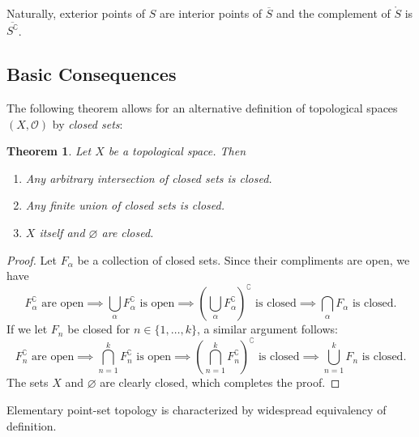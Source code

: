 \documentclass[11pt]{article}
\newtheorem{theorem}{Theorem}
\renewcommand{\O}{\mathcal{O}}
\begin{document}
Naturally, exterior points of $S$ are interior points of $\overline{S}$ and the complement of $\mathring{S}$ is $\overline{S^{\complement}}$.


\subsection{Basic Consequences}

The following theorem allows for an alternative definition of topological spaces $(X, \O)$ by \textit{closed sets}:

\begin{adjustwidth}{0.5cm}{}
  \begin{theorem}
    Let $X$ be a topological space. Then
    \begin{enumerate}
      \item Any arbitrary intersection of closed sets is closed.
      \item Any finite union of closed sets is closed.
      \item $X$ itself and $\varnothing$ are closed.
    \end{enumerate}
\end{theorem}
  \begin{proof}
    Let $F_{\alpha}$ be a collection of closed sets. Since their compliments are open, we have
    \[
      F_{\alpha}^{\complement} \text{ are open} \implies \bigcup\limits_{\alpha} F_{\alpha}^{\complement} \text{ is open} \implies \left( \bigcup\limits_{\alpha} F_{\alpha}^{\complement} \right)^{\complement} \text{ is closed} \implies \bigcap\limits_{\alpha} F_{\alpha} \text{ is closed}.
    \]
    If we let $F_{n}$ be closed for $n \in \{ 1, \ldots, k \}$, a similar argument follows:
    \[
      F_{n}^{\complement} \text{ are open} \implies \bigcap\limits_{n = 1}^{k} F_{n}^{\complement} \text{ is open} \implies \left( \bigcap\limits_{n = 1}^{k} F_{n}^{\complement} \right)^{\complement} \text{ is closed} \implies \bigcup\limits_{n = 1}^{k} F_{n} \text{ is closed}.
    \]
    The sets $X$ and $\varnothing$ are clearly closed, which completes the proof. 
  \end{proof}
\end{adjustwidth}

Elementary point-set topology is characterized by widespread equivalency of definition.
\end{document}
